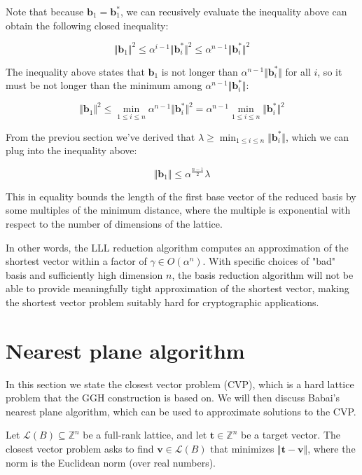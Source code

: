 \documentclass[letterpaper,12pt]{article}
\begin{document}
Note that because $\mathbf{b}_1 = \mathbf{b}_1^\ast$, we can recusively evaluate the inequality above can obtain the following closed inequality:

$$
\Vert \mathbf{b}_1 \Vert^2 \leq \alpha^{i-1} \Vert \mathbf{b}_{i}^\ast \Vert^2 \leq \alpha^{n-1} \Vert \mathbf{b}_{i}^\ast \Vert^2
$$

The inequality above states that $\mathbf{b}_1$ is not longer than $\alpha^{n-1} \Vert \mathbf{b}_{i}^\ast \Vert$ for all $i$, so it must be not longer than the minimum among $\alpha^{n-1} \Vert \mathbf{b}_{i}^\ast \Vert$:

$$
\Vert \mathbf{b}_1 \Vert^2 \leq \min_{1 \leq i \leq n}\alpha^{n-1} \Vert \mathbf{b}_{i}^\ast \Vert^2 = \alpha^{n-1} \min_{1 \leq i \leq n}\Vert \mathbf{b}_{i}^\ast \Vert^2
$$

From the previou section we've derived that $\lambda \geq \min_{1 \leq i \leq n} \Vert \mathbf{b}_i^\ast \Vert$, which we can plug into the inequality above:

$$
\Vert \mathbf{b}_1 \Vert \leq \alpha^\frac{n-1}{2} \lambda
$$

This in equality bounds the length of the first base vector of the reduced basis by some multiples of the minimum distance, where the multiple is exponential with respect to the number of dimensions of the lattice.

In other words, the LLL reduction algorithm computes an approximation of the shortest vector within a factor of $\gamma \in O(\alpha^n)$. With specific choices of "bad" basis and sufficiently high dimension $n$, the basis reduction algorithm will not be able to provide meaningfully tight approximation of the shortest vector, making the shortest vector problem suitably hard for cryptographic applications.


\section{Nearest plane algorithm}
In this section we state the closest vector problem (CVP), which is a hard lattice problem that the GGH construction is based on. We will then discuss Babai's nearest plane algorithm, which can be used to approximate solutions to the CVP.

Let $\mathcal{L}(B) \subseteq \mathbb{Z}^n$ be a full-rank lattice, and let $\mathbf{t} \in \mathbb{Z}^n$ be a target vector. The closest vector problem asks to find $\mathbf{v} \in \mathcal{L}(B)$ that minimizes $\Vert \mathbf{t} - \mathbf{v} \Vert$, where the norm is the Euclidean norm (over real numbers).
\end{document}
